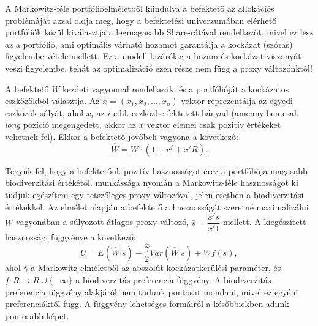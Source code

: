 A Markowitz-féle portfólióelméletből kiindulva a befektető az allokációs problémáját azzal oldja meg, hogy a befektetési univerzumában elérhető portfóliók közül kiválasztja a legmagasabb Share-rátával rendelkezőt, mivel ez lesz az a portfólió, ami optimális várható hozamot garantálja a kockázat (szórás) figyelembe vétele mellett. Ez a modell kizárólag a hozam és kockázat viszonyát veszi figyelembe, tehát az optimalizáció ezen része nem függ a proxy változónktól!

A befektető $W$ kezdeti vagyonnal rendelkezik, és a portfólióját a kockázatos eszközökből választja. Az $x=(x_1,x_2,\dots,x_n)$ vektor reprezentálja az egyedi eszközök súlyát, ahol $x_i$ az $i$-edik eszközbe fektetett hányad (amennyiben csak \textit{long} pozíció megengedett, akkor az $x$ vektor elemei csak pozitív értékeket vehetnek fel). Ekkor a befektető jövőbeli vagyona a következő:
\begin{equation}
	\widehat{W}=W\cdot (1+r^f+x'R).
\end{equation}

Tegyük fel, hogy a befektetőnk pozitív hasznosságot érez a portfóliója magasabb biodiverzitási értékétől. \textcite{pedersen_responsible_2021} munkássága nyomán a Markowitz-féle hasznosságot ki tudjuk egészíteni egy tetszőleges proxy változóval, jelen esetben a biodiverzitási értékekkel.
Az elmélet alapján a befektető a hasznosságát szeretné maximalizálni $W$ vagyonában a súlyozott átlagos proxy változó, $\bar{s}=\dfrac{x's}{x'1}$ mellett. A kiegészített hasznossági függvénye a következő:
\begin{equation}
    U = E(\widehat{W}|s) - \frac{\hat{\gamma}}{2}Var(\widehat{W}|s) + Wf(\bar{s}),
\end{equation}
ahol $\bar{\gamma}$ a Markowitz elméletből az abszolút kockázatkerülési paraméter, és $f: R \to R \cup \{-\infty\}$ a biodiverzitás-preferencia függvény. A biodiverzitás-preferencia függvény alakjáról nem tudunk pontosat mondani, mivel ez egyéni preferenciáktól függ. A függvény lehetséges formáiról a későbbiekben adunk pontosabb képet.


